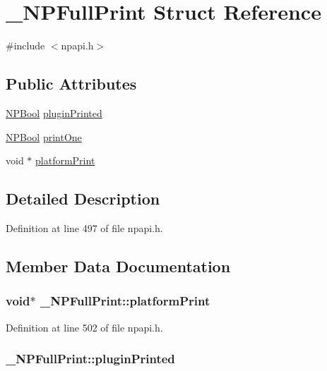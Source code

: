 \hypertarget{struct___n_p_full_print}{
\section{\_\-NPFullPrint Struct Reference}
\label{struct___n_p_full_print}
}


{\ttfamily \#include $<$npapi.h$>$}

\subsection*{Public Attributes}
\begin{DoxyCompactItemize}
\item 
\hyperlink{npapi_8h_acaaa85dcdc33ec2865fb0544f1792142}{NPBool} \hyperlink{struct___n_p_full_print_a3ca77a50210f8e9e8232992b3ab7682e}{pluginPrinted}
\item 
\hyperlink{npapi_8h_acaaa85dcdc33ec2865fb0544f1792142}{NPBool} \hyperlink{struct___n_p_full_print_a809c29777645db1a739e48a30803c1f1}{printOne}
\item 
void $\ast$ \hyperlink{struct___n_p_full_print_a747b4c22896b774a1746715dce29c609}{platformPrint}
\end{DoxyCompactItemize}


\subsection{Detailed Description}


Definition at line 497 of file npapi.h.



\subsection{Member Data Documentation}
\hypertarget{struct___n_p_full_print_a747b4c22896b774a1746715dce29c609}{
\subsubsection[{platformPrint}]{\setlength{\rightskip}{0pt plus 5cm}void$\ast$ {\bf \_\-NPFullPrint::platformPrint}}}
\label{struct___n_p_full_print_a747b4c22896b774a1746715dce29c609}


Definition at line 502 of file npapi.h.

\hypertarget{struct___n_p_full_print_a3ca77a50210f8e9e8232992b3ab7682e}{
\subsubsection[{pluginPrinted}]{ {\bf \_\-NPFullPrint::pluginPrinted}}}
\label{struct___n_p_full_print_a3ca77a50210f8e9e8232992b3ab7682e}


